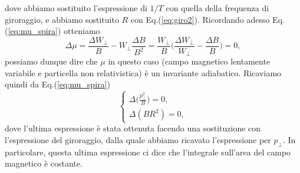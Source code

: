 dove abbiamo sostituito l'espressione di $1/T$ con quella della frequenza di giroraggio, e abbiamo sostituito $R$ con Eq.(\ref{eq:giro2}). Ricordando adesso Eq.(\ref{eq:mu_spira}) otteniamo
\begin{equation*}
    \Delta \mu = \frac{\Delta W_\bot}{B} - W_\bot \frac{\Delta B}{B^2} = \frac{W_\bot}{B}\biggl(\frac{\Delta W_\bot}{W_\bot} - \frac{\Delta B}{B}\biggr) = 0,
\end{equation*}
possiamo dunque dire che $\mu$ in questo caso (campo magnetico lentamente variabile e particella non relativistica) è un invariante adiabatico. Ricaviamo quindi da Eq.(\ref{eq:mu_spira})
\begin{equation}  
    \begin{cases}
        \Delta \biggl(\displaystyle\frac{p_\bot^2}{B}\biggr) = 0, \\
        \Delta (BR^2) = 0,
    \end{cases}
    \label{eq:adiabatico}
\end{equation}
dove l'ultima espressione è stata ottenuta facendo una sostituzione con l'espressione del giroraggio, dalla quale abbiamo ricavato l'espressione per $p_\bot$. In particolare, questa ultima espressione ci dice che l'integrale sull'area del campo magnetico è costante.

